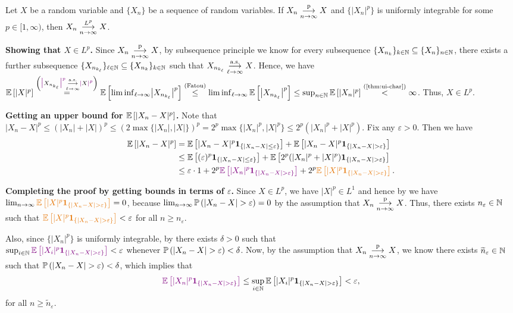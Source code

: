 \begin{enumerate}
\begin{theorem}
\label{thm:conv-ip-ui-imply-lp}
Let \(X\) be a random variable and \(\{X_n\}\) be a sequence of random
variables. If \(X_n\underset{n\to\infty}{\overset{\text{p}}{\longrightarrow}} X\) and \(\{|X_n|^{p}\}\) is uniformly integrable for
some \(p\in [1,\infty)\), then \(X_n\underset{n\to\infty}{\overset{L^p}{\longrightarrow}} X\).
\end{theorem}
\begin{pf}
\textbf{Showing that \(X\in L^p\).}
Since \(X_n\underset{n\to\infty}{\overset{\text{p}}{\longrightarrow}} X\), by subsequence principle we know for every subsequence
\(\{X_{n_{k}}\}_{k\in\mathbb{N}}\subseteq \{X_n\}_{n\in\mathbb{N}}\), there
exists a further subsequence \(\{X_{n_{k_{\ell}}}\}_{\ell\in\mathbb{N}}\subseteq
\{X_{n_{k}}\}_{k\in\mathbb{N}}\) such that
\(X_{n_{k_{\ell}}}\underset{\ell\to\infty}{\overset{\text{a.s.}}{\longrightarrow}}X\).
Hence, we have \(\expv{|X|^{p}}
\overset{\left(\vc{\bigl|}X_{n_{k_{\ell}}}\vc{\bigr|^{p}}\tox{\ell}{\text{a.s.}}
\vc{|}X\vc{|^{p}}\right)}{=}
\expv{\liminf_{\ell\to \infty}\bigl|X_{n_{k_{\ell}}}\bigr|^{p}}
\overset{\text{(Fatou)}}{\le}\liminf_{\ell\to \infty}
\expv{\bigl|X_{n_{k_{\ell}}}\bigr|^{p}}
\le\sup_{n\in\N}\expv{|X_n|^{p}}\overset{\text{(\Cref{thm:ui-char})}}{<}\infty\).
Thus, \(X\in L^p\).

\textbf{Getting an upper bound for \(\mathbb{E}\left[|X_n-X|^{p}\right]\).}
Note that \(|X_n-X|^{p}\le (|X_n|+|X|)^{p}
\le (2\max\{|X_n|,|X|\})^{p}=2^{p}\max\{|X_n|^{p},|X|^{p}\}\le
2^p(|X_n|^{p}+|X|^{p})\). Fix any \(\varepsilon>0\). Then we have
\begin{align*}
\expv{|X_n-X|^{p}}
&=\expv{|X_n-X|^{p}\indicset{|X_n-X|\le\varepsilon}}
+\expv{|X_n-X|^{p}\indicset{|X_n-X|>\varepsilon}} \\
&\le \expv{(\varepsilon)^{p}\indicset{|X_n-X|\le\varepsilon}}
+\expv{2^p(|X_n|^{p}+|X|^{p})\indicset{|X_n-X|>\varepsilon}} \\
&\le \varepsilon\cdot 1
+2^{p}\vc{\expv{|X_n|^{p}\indicset{|X_n-X|>\varepsilon}}}
+2^{p}\orc{\expv{|X|^{p}\indicset{|X_n-X|>\varepsilon}}}.
\end{align*}

\textbf{Completing the proof by getting bounds in terms of \(\varepsilon\).}
Since \(X\in L^p\), we have \(|X|^{p}\in L^1\) and hence by
 we have
\(\lim_{n\to\infty}\orc{\expv{|X|^{p}\indicset{|X_n-X|>\varepsilon}}}=0\),
because \(\lim_{n\to\infty}\prob{|X_n-X|>\varepsilon}=0\) by the
assumption that \(X_n\underset{n\to\infty}{\overset{\text{p}}{\longrightarrow}} X\). Thus, there exists \(n_{\varepsilon}\in\mathbb{N}\)
such that
\(\orc{\expv{|X|^{p}\indicset{|X_n-X|>\varepsilon}}}<\varepsilon\) for all
\(n\ge n_{\varepsilon}\).

Also, since \(\{|X_n|^{p}\}\) is uniformly integrable, by 
there exists \(\delta>0\) such that \\
\(\sup_{i\in\N}\vc{\expv{|X_i|^{p}\indicset{|X_n-X|>\varepsilon}}}<\varepsilon\)
whenever \(\prob{|X_n-X|>\varepsilon}<\delta\). Now, by the assumption that
\(X_n\underset{n\to\infty}{\overset{\text{p}}{\longrightarrow}} X\), we know there exists \(\widetilde{n}_{\varepsilon}\in\mathbb{N}\) such
that \(\prob{|X_n-X|>\varepsilon}<\delta\), which implies that
\[\vc{\expv{|X_n|^{p}\indicset{|X_n-X|>\varepsilon}}}\le
\sup_{i\in\N}\expv{|X_i|^{p}\indicset{|X_n-X|>\varepsilon}}<\varepsilon,\]
for all \(n\ge\widetilde{n}_{\varepsilon}\).


\end{pf}
\end{enumerate}
